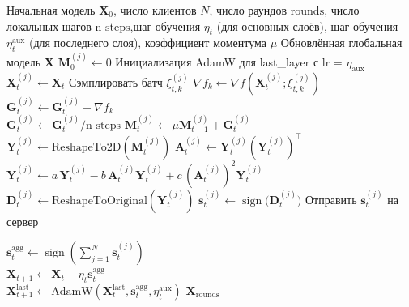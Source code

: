 \documentclass{article}
\begin{document}
\begin{algorithm}[H]
\caption{Federated SignMuon}
\begin{algorithmic}[1]
\Require Начальная модель $\mathbf{X}_0$, число клиентов $N$, число раундов $\mathrm{rounds}$, число локальных шагов $\mathrm{n\_steps}$,шаг обучения $\eta_t$ (для основных слоёв), шаг обучения $\eta_t^{\text{aux}}$ (для последнего слоя), коэффициент моментума $\mu$
\Ensure Обновлённая глобальная модель $\mathbf{X}$
 \State $\mathbf{M}_0^{(j)} \gets 0$ 
\EndFor
\State Инициализация AdamW для last\_layer с lr = $\eta_{\mathrm{aux}}$
        \State $\mathbf{X}_t^{(j)} \gets \mathbf{X}_t$ 
            \State Сэмплировать батч $\xi_{t,k}^{(j)}$
            \State $\nabla f_k \gets \nabla f(\mathbf{X}_t^{(j)}; \xi_{t,k}^{(j)})$
            \State $\mathbf{G}_t^{(j)} \gets \mathbf{G}_t^{(j)} + \nabla f_k$
        \EndFor
        \\ \State $\mathbf{G}_t^{(j)} \gets \mathbf{G}_t^{(j)} / \mathrm{n\_steps}$ 
        \State $\mathbf{M}_t^{(j)} \gets \mu \mathbf{M}_{t-1}^{(j)} + \mathbf{G}_t^{(j)}$ 
        \State $\mathbf{Y}_t^{(j)} \gets \text{ReshapeTo2D}(\mathbf{M}_t^{(j)})$ 
         
            \State $\mathbf{A}_t^{(j)} \gets \mathbf{Y}_t^{(j)} (\mathbf{Y}_t^{(j)})^\top$
            \State $\mathbf{Y}_t^{(j)} \gets a\,\mathbf{Y}_t^{(j)} - b\,\mathbf{A}_t^{(j)}\mathbf{Y}_t^{(j)} + c\,(\mathbf{A}_t^{(j)})^2\mathbf{Y}_t^{(j)}$
        \EndFor
        \State $\mathbf{D}_t^{(j)} \gets \text{ReshapeToOriginal}(\mathbf{Y}_t^{(j)})$ 
        \State $\mathbf{s}_t^{(j)} \gets \operatorname{sign}\bigl(\mathbf{D}_t^{(j)}\bigr)$ 
        \State Отправить $\mathbf{s}_t^{(j)}$ на сервер
    \EndFor
    
    \State $\mathbf{s}_t^{\mathrm{agg}} \gets \operatorname{sign}\!\left(\sum_{j=1}^{N} \mathbf{s}_t^{(j)}\right)$ 
    \\
    \State $\mathbf{X}_{t+1} \gets \mathbf{X}_t - \eta_t \mathbf{s}_t^{\mathrm{agg}}$ 
    \\
    \State $\mathbf{X}_{t+1}^{\text{last}} \gets \text{AdamW}(\mathbf{X}_t^{\text{last}}, \mathbf{s}_t^{\mathrm{agg}}, \eta_t^{\text{aux}})$ 
\EndFor
\State \Return $\mathbf{X}_{\mathrm{rounds}}$
\label{fed_alg}
\end{algorithmic}
\end{algorithm}
\end{document}
